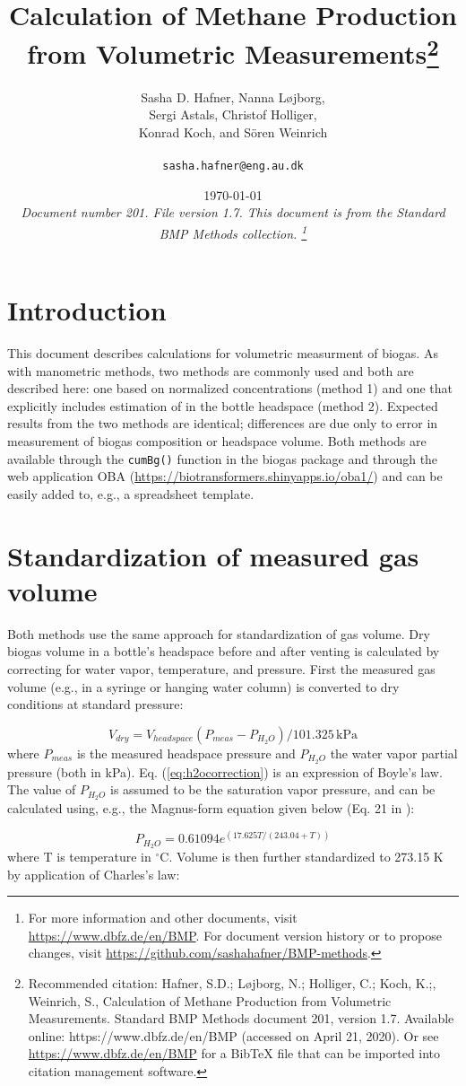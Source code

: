 \documentclass[]{article}
\title {Calculation of Methane Production from Volumetric Measurements\footnote{
  Recommended citation: 
Hafner, S.D.; L\o jborg, N.; Holliger, C.; Koch, K.;, Weinrich, S., Calculation of Methane Production from Volumetric Measurements. Standard BMP Methods document 201, version 1.7. Available online: https://www.dbfz.de/en/BMP (accessed on April 21, 2020).
\newline
  Or see \url{https://www.dbfz.de/en/BMP} for a BibTeX file that can be imported into citation management software.
}}
\author{Sasha D. Hafner, Nanna L\o jborg, \\ Sergi Astals, Christof Holliger, \\ Konrad Koch, and S{\"o}ren Weinrich\\
\\
\texttt{sasha.hafner@eng.au.dk}
}
\date{\today \\
\bigskip
\textit{
  Document number 201.
  File version 1.7. 
  This document is from the Standard BMP Methods collection.
    \footnote{For more information and other documents, visit \url{https://www.dbfz.de/en/BMP}. 
    For document version history or to propose changes, visit \url{https://github.com/sashahafner/BMP-methods}.}
}
}
\newcommand{\unit}[1]{\ensuremath{\, \mathrm{#1}}}
\begin{document}
\maketitle

\section{Introduction}
This document describes calculations for volumetric measurment of biogas.
As with manometric methods, two methods are commonly used and both are described here: one based on normalized  concentrations (method 1) and one that explicitly includes estimation of  in the bottle headspace (method 2).
Expected results from the two methods are identical; differences are due only to error in measurement of biogas composition or headspace volume.
Both methods are available through the \texttt{cumBg()} function in the biogas package \citep{hafnerSoftwareBiogasResearch2018} and through the web application OBA (\url{https://biotransformers.shinyapps.io/oba1/}) and can be easily added to, e.g., a spreadsheet template.

\section{Standardization of measured gas volume}
Both methods use the same approach for standardization of gas volume.
Dry biogas volume in a bottle's headspace before and after venting is calculated by correcting for water vapor, temperature, and pressure.
First the measured gas volume (e.g., in a syringe or hanging water column) is converted to dry conditions at standard pressure:

\begin{equation}
  \label{eq:h2ocorrection}
  V_{dry} = V_{headspace}(P_{meas} - P_{H_2O})/101.325 \unit{kPa}
\end{equation}
where $P_{meas}$ is the measured headspace pressure and $P_{H_2O}$ the water vapor partial pressure (both in kPa).
Eq. (\ref{eq:h2ocorrection}) is an expression of Boyle's law.
The value of $P_{H_2O}$ is assumed to be the saturation vapor pressure, and can be calculated using, e.g., the Magnus-form equation given below (Eq. 21 in \citet{alduchovImprovedMagnusForm1996}):

\begin{equation}
\label{eq:magnus}
   P_{H_2O} = 0.61094 e^{(17.625 T/(243.04 + T))}
\end{equation}
where T is temperature in $^\circ$C.
Volume is then further standardized to 273.15 K by application of Charles's law:
\end{document}
